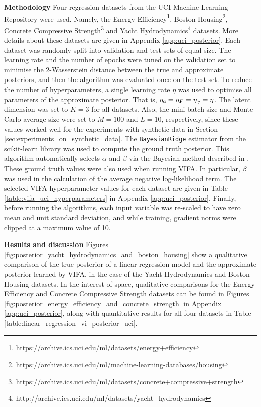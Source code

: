 \documentclass[10pt]{article} %
\newcommand{\vgamma}{\bm{\gamma}}
\begin{document}
\textbf{Methodology}  Four regression datasets from the UCI Machine Learning Repository \citep{dua2019} were used. Namely, the Energy Efficiency\footnote{https://archive.ics.uci.edu/ml/datasets/energy+efficiency}, Boston Housing\footnote{https://archive.ics.uci.edu/ml/machine-learning-databases/housing}, Concrete Compressive Strength\footnote{https://archive.ics.uci.edu/ml/datasets/concrete+compressive+strength} and Yacht Hydrodynamics\footnote{http://archive.ics.uci.edu/ml/datasets/yacht+hydrodynamics} datasets. More details about these datasets are given in Appendix \ref{app:uci_posterior}.  Each dataset was randomly split into validation and test sets of equal size. The learning rate and the number of epochs were tuned on the validation set to minimise the 2-Wasserstein distance between the true and approximate posteriors, and then the algorithm was evaluated once on the test set. To reduce the number of hyperparameters, a single learning rate $\eta$ was used to optimise all parameters of the approximate posterior. That is, $\eta_\vc = \eta_\mF = \eta_{\vgamma} = \eta$. The latent dimension was set to $K=3$ for all datasets. Also, the mini-batch size and Monte Carlo average size were set to $M=100$ and $L=10$, respectively, since these values worked well for the experiments with synthetic data in Section \ref{sec:experiments_on_synthetic_data}. The \texttt{BayesianRidge} estimator from the scikit-learn library \citep{pedregosa2012} was used to compute the ground truth posterior. This algorithm automatically selects $\alpha$ and $\beta$ via the Bayesian method described in \citep{mackay1992}. These ground truth values were also used when running VIFA. In particular, $\beta$ was used in the calculation of the average negative log-likelihood term. The selected VIFA hyperparameter values for each dataset are given in Table \ref{table:vifa_uci_hyperparameters} in Appendix \ref{app:uci_posterior}. Finally, before running the algorithms, each input variable was re-scaled to have zero mean and unit standard deviation, and while training, gradient norms were clipped at a maximum value of 10. 


\textbf{Results and discussion}
Figures \ref{fig:posterior_yacht_hydrodynamics_and_boston_housing} show a qualitative comparison of the true posterior of a linear regression model and the approximate posterior learned by VIFA, in the case of the Yacht Hydrodynamics and Boston Housing datasets. In the interest of space, qualitative comparisons for the Energy Efficiency and Concrete Compressive Strength datasets can be found in Figures \ref{fig:posterior_energy_efficiency_and_concrete_strength} in Appendix \ref{app:uci_posterior}, along with quantitative results for all four datasets in Table \ref{table:linear_regression_vi_posterior_uci}.
\end{document}
